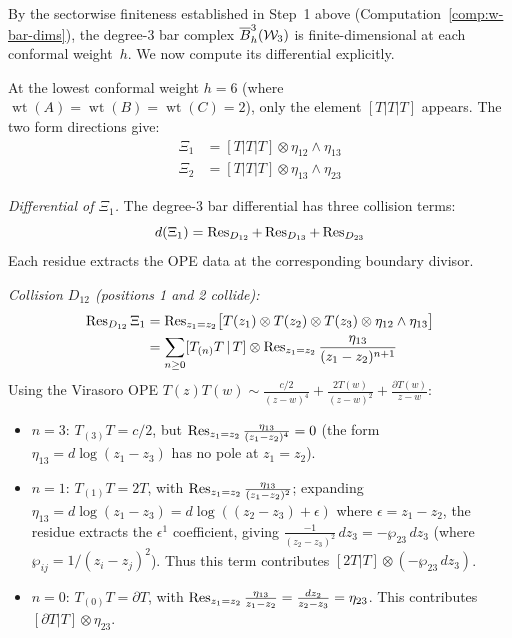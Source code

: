 By the sectorwise finiteness established in Step~1 above
(Computation~\ref{comp:w-bar-dims}), the degree-3 bar complex
$\overline{B}^3_h(\mathcal{W}_3)$ is finite-dimensional at each
conformal weight~$h$.  We now compute its differential explicitly.

\begin{computation}
\label{comp:w3-deg3-structure}

At the lowest conformal weight $h = 6$ (where
$\operatorname{wt}(A) = \operatorname{wt}(B) = \operatorname{wt}(C) = 2$),
only the element $[T|T|T]$ appears.  The two form directions give:
\begin{align}
\Xi_1 &= [T|T|T] \otimes \eta_{12} \wedge \eta_{13}
\label{eq:w3-deg3-xi1} \\
\Xi_2 &= [T|T|T] \otimes \eta_{13} \wedge \eta_{23}
\label{eq:w3-deg3-xi2}
\end{align}

\emph{Differential of $\Xi_1$.}
The degree-3 bar differential has three collision terms:
\[
d(\Xi_1) = \operatorname{Res}_{D_{12}} + \operatorname{Res}_{D_{13}} + \operatorname{Res}_{D_{23}}
\]
Each residue extracts the OPE data at the corresponding boundary divisor.

\emph{Collision $D_{12}$ (positions 1 and 2 collide):}
\begin{align*}
\operatorname{Res}_{D_{12}}\Xi_1
&= \operatorname{Res}_{z_1 = z_2}\bigl[T(z_1) \otimes T(z_2)
\otimes T(z_3) \otimes \eta_{12} \wedge \eta_{13}\bigr] \\
&= \sum_{n \geq 0} [T_{(n)}T \,|\, T] \otimes
\operatorname{Res}_{z_1 = z_2}\frac{\eta_{13}}{(z_1-z_2)^{n+1}}
\end{align*}
Using the Virasoro OPE
$T(z)T(w) \sim \frac{c/2}{(z-w)^4} + \frac{2T(w)}{(z-w)^2}
+ \frac{\partial T(w)}{z-w}$:
\begin{itemize}
\item $n = 3$: $T_{(3)}T = c/2$, but $\operatorname{Res}_{z_1=z_2}
\frac{\eta_{13}}{(z_1-z_2)^4} = 0$ (the form $\eta_{13}
= d\log(z_1-z_3)$ has no pole at $z_1 = z_2$).
\item $n = 1$: $T_{(1)}T = 2T$, with $\operatorname{Res}_{z_1=z_2}
\frac{\eta_{13}}{(z_1-z_2)^2}$; expanding
$\eta_{13} = d\log(z_1-z_3) = d\log((z_2-z_3)+\epsilon)$ where
$\epsilon = z_1-z_2$, the residue extracts the $\epsilon^1$
coefficient, giving $\frac{-1}{(z_2-z_3)^2}\,dz_3 = -\wp_{23}\,dz_3$
(where $\wp_{ij} = 1/(z_i-z_j)^2$).  Thus this term contributes
$[2T|T] \otimes (-\wp_{23}\,dz_3)$.
\item $n = 0$: $T_{(0)}T = \partial T$, with $\operatorname{Res}_{z_1=z_2}
\frac{\eta_{13}}{z_1-z_2} = \frac{dz_2}{z_2-z_3} = \eta_{23}$.
This contributes $[\partial T|T] \otimes \eta_{23}$.
\end{itemize}


\end{computation}

